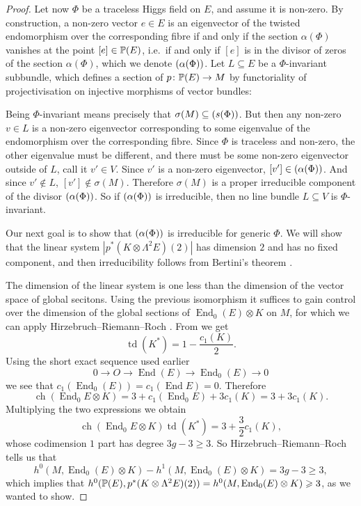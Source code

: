 \documentclass[A4paper, 12pt, british, reqno]{amsart}
\DeclareMathOperator{\End}{End}
\let\div\relax
\DeclareMathOperator{\div}{div}
\newcommand{\ot}{\otimes}
\newcommand{\dual}{^{*}}
\begin{document}
\begin{prop}
\begin{proof}
	Let now $\Phi$ be a traceless Higgs field on $E$, and assume it is non-zero.
	By construction, a non-zero vector $e\in E$ is an eigenvector of the twisted endomorphism over the corresponding fibre if and only if the section $\alpha(\Phi)$ vanishes at the point $[e]\in \P(E)$, i.e.~if and only if $[e]$ is in the divisor of zeros of the section $\alpha(\Phi)$, which we denote $\div(\alpha(\Phi))$.
	Let $L\subseteq E$ be a $\Phi$-invariant subbundle, which defines a section of $p\colon \P(E)\to M$ by functoriality of projectivisation on injective morphisms of vector bundles:
	\begin{center}
	\end{center}
	Being $\Phi$-invariant means precisely that $\sigma(M)\subseteq \div(s(\Phi))$.
	But then any non-zero $v\in L$ is a non-zero eigenvector corresponding to some eigenvalue of the endomorphism over the corresponding fibre.
	Since $\Phi$ is traceless and non-zero, the other eigenvalue must be different, and there must be some non-zero eigenvector outside of $L$, call it $v'\in V$.
	Since $v'$ is a non-zero eigenvector, $[v']\in \div(\alpha(\Phi))$.
	And since $v'\not\in L$, $[v']\not\in \sigma(M)$.
	Therefore $\sigma(M)$ is a proper irreducible component of the divisor $\div(\alpha(\Phi))$.
	So if $\div(\alpha(\Phi))$ is irreducible, then no line bundle $L\subseteq V$ is $\Phi$-invariant.

	Our next goal is to show that $\div(\alpha(\Phi))$ is irreducible for generic $\Phi$.
	We will show that the linear system $|p^{*}(K\ot\Lambda^{2}E)(2)|$ has dimension $2$ and has no fixed component, and then irreducibility follows from Bertini's theorem \cite[Theorem 7.19]{iit82}.

	The dimension of the linear system is one less than the dimension of the vector space of global secitons.
	Using the previous isomorphism it suffices to gain control over the dimension of the global sections of $\End_{0}(E)\ot K$ on $M$, for which we can apply Hirzebruch--Riemann--Roch \cite[Theorem A.4.1]{har77}.
	From \cite[Example A.4.1.1]{har77} we get
	\[ \operatorname{td}(K\dual)=1-\frac{c_{1}(K)}{2}. \]
	Using the short exact sequence used earlier
	\[ 0\to O\to \End(E) \to \End_{0}(E)\to 0 \]
	we see that $c_{1}(\End_{0}(E))=c_{1}(\End{E})=0$.
	Therefore
	\[ \operatorname{ch}(\End_{0}{E}\ot K)=3+c_{1}(\End_{0}{E})+3c_{1}(K)=3+3c_{1}(K). \]
	Multiplying the two expressions we obtain
	\[ \operatorname{ch}(\End_{0}{E}\ot K)\operatorname{td}(K\dual)=3+\frac{3}{2}c_{1}(K), \]
	whose codimension $1$ part has degree $3g-3\geqslant 3$.
	So Hirzebruch--Riemann--Roch tells us that
	\[ h^{0}(M,\End_{0}(E)\ot K)-h^{1}(M,\End_{0}(E)\ot K)=3g-3\geqslant 3, \]
	which implies that $h^{0}(\P(E),p^{*}(K\ot \Lambda^{2}E)(2))=h^{0}(M,\End_{0}(E)\ot K)\geqslant 3$, as we wanted to show.


\end{proof}
\end{prop}
\end{document}
